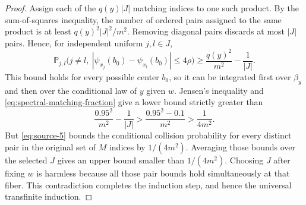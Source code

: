 \begin{proof}
Assign each of the $q(y)|J|$ matching indices to one such product.
By the sum-of-squares inequality, the number of ordered pairs assigned
to the same product is at least $q(y)^2|J|^2/m^2$. Removing diagonal
pairs discards at most $|J|$ pairs. Hence, for independent uniform
$j,l\in J$,
\[
 \mathbb P_{j,l}\bigl(j\ne l,\ 
 |\psi_{x_j}(b_0)-\psi_{x_l}(b_0)|\le4\rho\bigr)
 \ge\frac{q(y)^2}{m^2}-\frac1{|J|}.
\]
This bound holds for every possible center $b_0$, so it can be
integrated first over $\beta_y$ and then over the conditional law of
$y$ given $w$. Jensen's inequality and
\eqref{eq:spectral-matching-fraction} give a lower bound strictly
greater than
\[
 \frac{0.95^2}{m^2}-\frac1{|J|}
 >\frac{0.95^2-0.1}{m^2}
 >\frac1{4m^2}.
\]
But \eqref{eq:source-5} bounds the conditional collision probability
for every distinct pair in the original set of $M$ indices by
$1/(4m^2)$. Averaging those bounds over the selected $J$ gives an
upper bound smaller than $1/(4m^2)$. Choosing $J$ after fixing $w$
is harmless because all those pair bounds hold simultaneously at that
fiber. This contradiction completes the induction step, and hence the
universal transfinite induction.
\end{proof}
